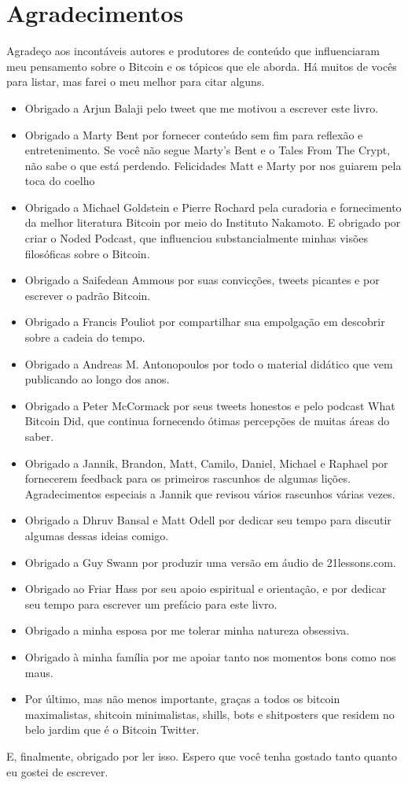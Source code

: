 \chapter*{Agradecimentos}

Agradeço aos incontáveis autores e produtores de conteúdo que influenciaram meu pensamento sobre o Bitcoin e os tópicos que ele aborda. Há muitos de vocês para listar, mas farei o meu melhor para citar alguns.

\begin{itemize}
  \item Obrigado a Arjun Balaji pelo tweet que me motivou a escrever este livro.
  \item Obrigado a Marty Bent por fornecer conteúdo sem fim para reflexão e entretenimento. Se você não segue Marty’s Bent e o Tales From The Crypt, não sabe o que está perdendo. Felicidades Matt e Marty por nos guiarem pela toca do coelho
  \item Obrigado a Michael Goldstein e Pierre Rochard pela curadoria e fornecimento da melhor literatura Bitcoin por meio do Instituto Nakamoto. E obrigado por criar o Noded Podcast, que influenciou substancialmente minhas visões filosóficas sobre o Bitcoin.
  \item Obrigado a Saifedean Ammous por suas convicções, tweets picantes e por escrever o padrão Bitcoin.
  \item Obrigado a Francis Pouliot por compartilhar sua empolgação em descobrir sobre a cadeia do tempo.
  \item Obrigado a Andreas M. Antonopoulos por todo o material didático que vem publicando ao longo dos anos.
  \item Obrigado a Peter McCormack por seus tweets honestos e pelo podcast What Bitcoin Did, que continua fornecendo ótimas percepções de muitas áreas do saber.
  \item Obrigado a Jannik, Brandon, Matt, Camilo, Daniel, Michael e Raphael por fornecerem feedback para os primeiros rascunhos de algumas lições. Agradecimentos especiais a Jannik que revisou vários rascunhos várias vezes.
  \item Obrigado a Dhruv Bansal e Matt Odell por dedicar seu tempo para discutir algumas dessas ideias comigo.
  \item Obrigado a Guy Swann por produzir uma versão em áudio de 21lessons.com.
  \item Obrigado ao Friar Hass por seu apoio espiritual e orientação, e por dedicar seu tempo para escrever um prefácio para este livro.
  \item Obrigado a minha esposa por me tolerar minha natureza obsessiva.
  \item Obrigado à minha família por me apoiar tanto nos momentos bons como nos maus.
  \item Por último, mas não menos importante, graças a todos os bitcoin maximalistas, shitcoin minimalistas, shills, bots e shitposters que residem no belo jardim que é o Bitcoin Twitter.
\end{itemize}

E, finalmente, obrigado por ler isso. Espero que você tenha gostado tanto quanto eu gostei de escrever.